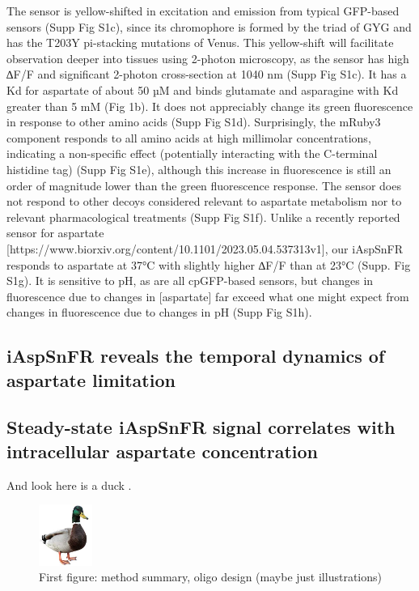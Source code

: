 \documentclass[9pt,lineno]{elife}
\begin{document}
The sensor is yellow-shifted in excitation and emission from typical GFP-based sensors (Supp Fig S1c), since its chromophore is formed by the triad of GYG and has the T203Y pi-stacking mutations of Venus.
This yellow-shift will facilitate observation deeper into tissues using 2-photon microscopy, as the sensor has high ∆F/F and significant 2-photon cross-section at 1040 nm (Supp Fig S1c).
It has a Kd for aspartate of about 50 µM and binds glutamate and asparagine with Kd greater than 5 mM (Fig 1b). It does not appreciably change its green fluorescence in response to other amino acids (Supp Fig S1d).
Surprisingly, the mRuby3 component responds to all amino acids at high millimolar concentrations, indicating a non-specific effect (potentially interacting with the C-terminal histidine tag) (Supp Fig S1e), although this increase in fluorescence is still an order of magnitude lower than the green fluorescence response.
The sensor does not respond to other decoys considered relevant to aspartate metabolism nor to relevant pharmacological treatments (Supp Fig S1f). Unlike a recently reported sensor for aspartate [https://www.biorxiv.org/content/10.1101/2023.05.04.537313v1], our iAspSnFR responds to aspartate at 37°C with slightly higher ∆F/F than at 23°C (Supp. Fig S1g).
It is sensitive to pH, as are all cpGFP-based sensors, but changes in fluorescence due to changes in [aspartate] far exceed what one might expect from changes in fluorescence due to changes in pH (Supp Fig S1h).


\subsection{iAspSnFR reveals the temporal dynamics of aspartate limitation}
\lipsum[5]




\subsection{Steady-state iAspSnFR signal correlates with intracellular aspartate concentration}
\lipsum[7]


And look here is a duck .






\begin{figure}[ht!]
\centering
\includegraphics[height=2cm]{figures/duck.jpg}
\caption{
First figure: method summary, oligo design (maybe just illustrations)
}
\label{fig:fig1}
\end{figure}
\end{document}
